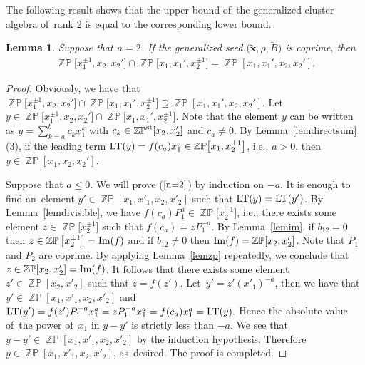 \documentclass[10pt,a4paper]{amsart}
\numberwithin{equation}{section}
\newtheorem{Lemma}[Theorem]{Lemma}
\begin{document}
The following result shows that the upper bound of~the generalized cluster algebra of~rank 2 is equal to the corresponding lower bound.
\begin{Lemma}\label{lemn=2}
Suppose that $n=2$. If the generalized seed $\big(\widetilde{\mathbf{x}},\rho,\widetilde{B}\big)$ is coprime, then
\begin{gather}\label{n=2}
\mathop{\mathbb{ZP}}\!\big[x^{\pm1}_1,x_{2},x_{2}'\big]\cap\mathop{\mathbb{ZP}}\!\big[x_{1},x_{1}',x^{\pm1}_2\big] =\mathop{\mathbb{ZP}}[x_1,x_{1}',x_{2},x_{2}'].
\end{gather}
\end{Lemma}
\begin{proof}
Obviously, we have that $\mathop{\mathbb{ZP}}\!\big[x^{\pm1}_1,x_{2},x_{2}'\big]\cap\mathop{\mathbb{ZP}}\!\big[x_{1},x_{1}',x^{\pm1}_2\big] \supseteq\mathop{\mathbb{ZP}}[x_1,x_{1}',x_{2},x_{2}']$. Let~$y\in\mathop{\mathbb{ZP}}\!\big[x^{\pm1}_1,x_{2},x_{2}'\big]\cap\mathop{\mathbb{ZP}}\!\big[x_{1},x_{1}',x^{\pm1}_2\big]$. Note that the element $y$ can be written as $y=\sum\limits_{k=a}^{b}c_kx_{1}^{k}$ with $c_k\in\mathop{\mathbb{ZP}}\nolimits^{\rm st}[x_2,x'_2]$ and $c_a\neq0$. By Lemma~\ref{lemdirectsum} (3), if the leading term $\mathop{\rm LT}(y)=f(c_a)x^{a}_1\in\mathop{\mathbb{ZP}}\!\big[x_{1},x^{\pm1}_2\big]$, i.e., $a > 0$, then $y\in\mathop{\mathbb{ZP}}[x_1,x_{2},x_{2}']$.

Suppose that $a\leq0$. We will prove ($\ref{n=2}$) by induction on $-a$. It is enough to find an~element $y'\in\mathop{\mathbb{ZP}}[x_1,x'_1,x_2,x'_2]$ such that $\mathop{\rm LT}(y)=\mathop{\rm LT}(y')$. By Lemma~\ref{lemdivisible}, we have $f(c_a)P^{a}_1\in\mathop{\mathbb{ZP}}\big[x^{\pm1}_2\big]$, i.e., there exists some element $z\in\mathop{\mathbb{ZP}}\big[x^{\pm1}_2\big]$ such that $f(c_a)=zP^{-a}_1$. By Lemma~\ref{lemim}, if $b_{12}=0$ then $z\in\mathop{\mathbb{ZP}}\big[x^{\pm1}_2\big]=\mathop{\rm Im}(f)$ and if $b_{12}\neq0$ then $\mathop{\rm Im}(f)=\mathop{\mathbb{ZP}}[x_2,x'_2]$. Note that $P_1$ and $P_2$ are coprime. By applying Lemma~\ref{lemzp} repeatedly, we conclude that $z\in\mathop{\mathbb{ZP}}[x_2,x'_2]=\mathop{\rm Im}(f)$. It follows that there exists some element $z'\in \mathop{\mathbb{ZP}}[x_2,x'_2]$ such that $z=f(z')$. Let~$y'=z'(x'_1)^{-a}$, then we have that $y'\in\mathop{\mathbb{ZP}}[x_1,x'_1,x_2,x'_2]$ and
$
\mathop{\rm LT}(y')=f(z')P^{-a}_1x^{a}_1=zP^{-a}_1x^{a}_1=f(c_a)x^{a}_1=\mathop{\rm LT}(y).
$
Hence the absolute value of~the power of~$x_1$ in $y-y'$ is strictly less than $-a$. We see that $y-y'\in \mathop{\mathbb{ZP}}[x_1,x'_1,x_2,x'_2]$ by the induction hypothesis. Therefore $y\in \mathop{\mathbb{ZP}}[x_1,x'_1,x_2,x'_2]$, as~desired. The proof is completed.
\end{proof}
\end{document}
